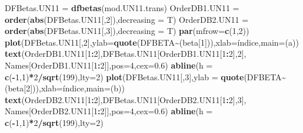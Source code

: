 \documentclass[
]{article}
\newenvironment{Shaded}{\begin{snugshade}}{\end{snugshade}}
\newcommand{\AttributeTok}[1]{\textcolor[rgb]{0.13,0.29,0.53}{#1}}
\newcommand{\DecValTok}[1]{\textcolor[rgb]{0.00,0.00,0.81}{#1}}
\newcommand{\FloatTok}[1]{\textcolor[rgb]{0.00,0.00,0.81}{#1}}
\newcommand{\FunctionTok}[1]{\textcolor[rgb]{0.13,0.29,0.53}{\textbf{#1}}}
\newcommand{\NormalTok}[1]{#1}
\newcommand{\OtherTok}[1]{\textcolor[rgb]{0.56,0.35,0.01}{#1}}
\newcommand{\SpecialCharTok}[1]{\textcolor[rgb]{0.81,0.36,0.00}{\textbf{#1}}}
\newcommand{\StringTok}[1]{\textcolor[rgb]{0.31,0.60,0.02}{#1}}
\begin{document}
\begin{Shaded}
\begin{Highlighting}[]
\NormalTok{DFBetas.UN11 }\OtherTok{=} \FunctionTok{dfbetas}\NormalTok{(mod.UN11.trans)}
\NormalTok{OrderDB1.UN11 }\OtherTok{=} \FunctionTok{order}\NormalTok{(}\FunctionTok{abs}\NormalTok{(DFBetas.UN11[,}\DecValTok{2}\NormalTok{]),}\AttributeTok{decreasing =}\NormalTok{ T)}
\NormalTok{OrderDB2.UN11 }\OtherTok{=} \FunctionTok{order}\NormalTok{(}\FunctionTok{abs}\NormalTok{(DFBetas.UN11[,}\DecValTok{3}\NormalTok{]),}\AttributeTok{decreasing =}\NormalTok{ T)}
\FunctionTok{par}\NormalTok{(}\AttributeTok{mfrow=}\FunctionTok{c}\NormalTok{(}\DecValTok{1}\NormalTok{,}\DecValTok{2}\NormalTok{))}
\FunctionTok{plot}\NormalTok{(DFBetas.UN11[,}\DecValTok{2}\NormalTok{],}\AttributeTok{ylab=}\FunctionTok{quote}\NormalTok{(}\StringTok{\textquotesingle{}DFBETA\textquotesingle{}}\SpecialCharTok{\textasciitilde{}}\NormalTok{(beta[}\DecValTok{1}\NormalTok{])),}\AttributeTok{xlab=}\StringTok{\textquotesingle{}índice\textquotesingle{}}\NormalTok{,}\AttributeTok{main=}\StringTok{\textquotesingle{}(a)\textquotesingle{}}\NormalTok{)}
\FunctionTok{text}\NormalTok{(OrderDB1.UN11[}\DecValTok{1}\SpecialCharTok{:}\DecValTok{2}\NormalTok{],DFBetas.UN11[OrderDB1.UN11[}\DecValTok{1}\SpecialCharTok{:}\DecValTok{2}\NormalTok{],}\DecValTok{2}\NormalTok{],}
\NormalTok{     Names[OrderDB1.UN11[}\DecValTok{1}\SpecialCharTok{:}\DecValTok{2}\NormalTok{]],}\AttributeTok{pos=}\DecValTok{4}\NormalTok{,}\AttributeTok{cex=}\FloatTok{0.6}\NormalTok{)}
\FunctionTok{abline}\NormalTok{(}\AttributeTok{h =} \FunctionTok{c}\NormalTok{(}\SpecialCharTok{{-}}\DecValTok{1}\NormalTok{,}\DecValTok{1}\NormalTok{)}\SpecialCharTok{*}\DecValTok{2}\SpecialCharTok{/}\FunctionTok{sqrt}\NormalTok{(}\DecValTok{199}\NormalTok{),}\AttributeTok{lty=}\DecValTok{2}\NormalTok{)}
\FunctionTok{plot}\NormalTok{(DFBetas.UN11[,}\DecValTok{3}\NormalTok{],}\AttributeTok{ylab =} \FunctionTok{quote}\NormalTok{(}\StringTok{\textquotesingle{}DFBETA\textquotesingle{}}\SpecialCharTok{\textasciitilde{}}\NormalTok{(beta[}\DecValTok{2}\NormalTok{])),}\AttributeTok{xlab=}\StringTok{\textquotesingle{}índice\textquotesingle{}}\NormalTok{,}\AttributeTok{main=}\StringTok{\textquotesingle{}(b)\textquotesingle{}}\NormalTok{)}
\FunctionTok{text}\NormalTok{(OrderDB2.UN11[}\DecValTok{1}\SpecialCharTok{:}\DecValTok{2}\NormalTok{],DFBetas.UN11[OrderDB2.UN11[}\DecValTok{1}\SpecialCharTok{:}\DecValTok{2}\NormalTok{],}\DecValTok{3}\NormalTok{],}
\NormalTok{     Names[OrderDB2.UN11[}\DecValTok{1}\SpecialCharTok{:}\DecValTok{2}\NormalTok{]],}\AttributeTok{pos=}\DecValTok{4}\NormalTok{,}\AttributeTok{cex=}\FloatTok{0.6}\NormalTok{)}
\FunctionTok{abline}\NormalTok{(}\AttributeTok{h =} \FunctionTok{c}\NormalTok{(}\SpecialCharTok{{-}}\DecValTok{1}\NormalTok{,}\DecValTok{1}\NormalTok{)}\SpecialCharTok{*}\DecValTok{2}\SpecialCharTok{/}\FunctionTok{sqrt}\NormalTok{(}\DecValTok{199}\NormalTok{),}\AttributeTok{lty=}\DecValTok{2}\NormalTok{)}
\end{Highlighting}
\end{Shaded}
\end{document}
